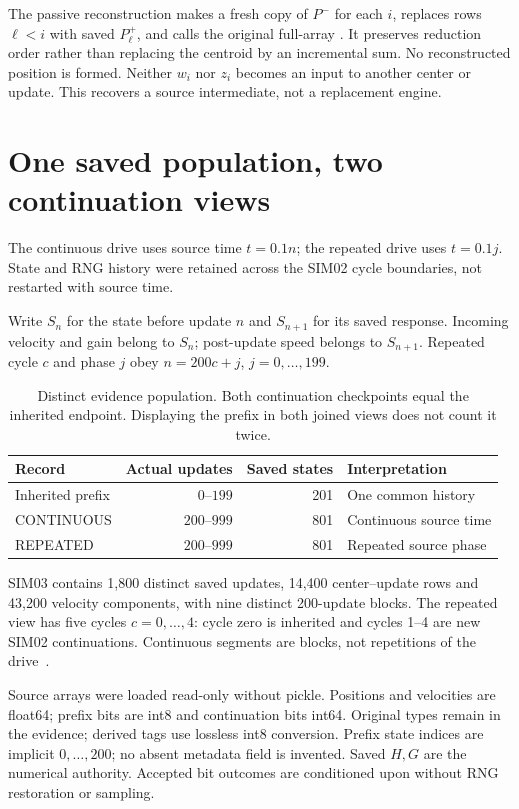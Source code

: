 \documentclass[11pt,a4paper]{article}
\newcommand{\RPT}{\textnormal{REPEATED}}
\newcommand{\CONT}{\textnormal{CONTINUOUS}}
\newcommand{\src}[1]{\texttt{\detokenize{#1}}}
\begin{document}
The passive reconstruction makes a fresh copy of $P^-$ for each $i$, replaces rows $\ell<i$ with saved $P^+_\ell$, and calls the original full-array \src{np.mean}. It preserves reduction order rather than replacing the centroid by an incremental sum. No reconstructed position is formed. Neither $w_i$ nor $z_i$ becomes an input to another center or update. This recovers a source intermediate, not a replacement engine.

\clearpage
\section{One saved population, two continuation views}
\label{sec:design}
The continuous drive uses source time $t=0.1n$; the repeated drive uses $t=0.1j$. State and RNG history were retained across the SIM02 cycle boundaries, not restarted with source time.

Write $S_n$ for the state before update $n$ and $S_{n+1}$ for its saved response. Incoming velocity and gain belong to $S_n$; post-update speed belongs to $S_{n+1}$. Repeated cycle $c$ and phase $j$ obey $n=200c+j$, $j=0,\ldots,199$.
\begin{table}[ht]
\centering\small
\begin{tabular}{lrrl}
\toprule
Record & Actual updates & Saved states & Interpretation\\
\midrule
Inherited prefix & $0$--$199$ & 201 & One common history\\
\CONT & $200$--$999$ & 801 & Continuous source time\\
\RPT & $200$--$999$ & 801 & Repeated source phase\\
\bottomrule
\end{tabular}
\caption{Distinct evidence population. Both continuation checkpoints equal the inherited endpoint. Displaying the prefix in both joined views does not count it twice.}
\label{tab:population}
\end{table}

SIM03 contains 1,800 distinct saved updates, 14,400 center--update rows and 43,200 velocity components, with nine distinct 200-update blocks. The repeated view has five cycles $c=0,\ldots,4$: cycle zero is inherited and cycles 1--4 are new SIM02 continuations. Continuous segments are blocks, not repetitions of the drive~\cite{report}.

Source arrays were loaded read-only without pickle. Positions and velocities are float64; prefix bits are int8 and continuation bits int64. Original types remain in the evidence; derived tags use lossless int8 conversion. Prefix state indices are implicit $0,\ldots,200$; no absent metadata field is invented. Saved $H,G$ are the numerical authority. Accepted bit outcomes are conditioned upon without RNG restoration or sampling.
\end{document}
